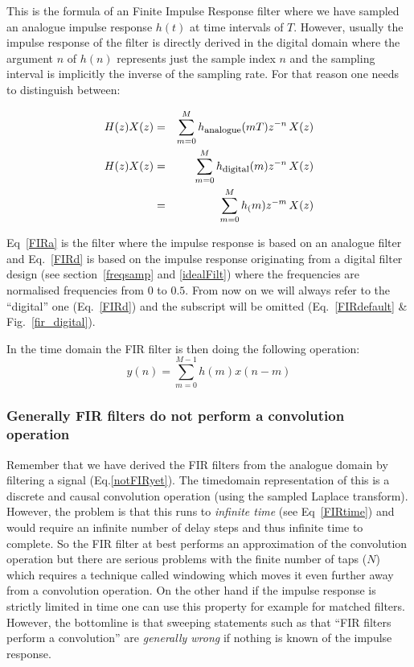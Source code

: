\documentclass[12pt,a4paper]{article}
\begin{document}
This is the formula of an Finite Impulse Response filter where we have
sampled an analogue impulse response $h(t)$ at time intervals of $T$.
However, usually the impulse response of the filter is directly derived
in the digital domain where the argument $n$ of $h(n)$ represents just the sample
index $n$ and the sampling interval is implicitly the inverse of the sampling
rate. For that reason one needs to distinguish between:

\begin{eqnarray}
H(z)X(z) & = & \sum_{m=0}^M h_\textrm{\footnotesize{analogue}}(mT) z^{-n} \, X(z) \label{FIRa} \\
H(z)X(z) & = & \sum_{m=0}^M h_\textrm{\footnotesize{digital}}(m) z^{-n} \, X(z) \label{FIRd} \\
         & = & \sum_{m=0}^M h_(m) z^{-m} \, X(z) \label{FIRdefault}
\end{eqnarray}

Eq~\ref{FIRa} is the filter where the impulse response is based on an analogue
filter and Eq.~\ref{FIRd} is based on the impulse response originating from a digital filter
design (see section~\ref{freqsamp} and \ref{idealFilt}) where the frequencies
are normalised frequencies from $0$ to $0.5$. From now on we will
always refer to the ``digital'' one (Eq.~\ref{FIRd}) and the subscript will be
omitted (Eq.~\ref{FIRdefault} \& Fig.~\ref{fir_digital}).

In the time domain the FIR filter is then doing the following operation:
\begin{equation}
  y(n) = \sum_{m=0}^{M-1} h(m) x(n-m) \label{FIRtime}
\end{equation}

\subsubsection{Generally FIR filters do not perform a convolution operation}

Remember that we have derived the FIR filters from the analogue domain
by filtering a signal (Eq.\ref{notFIRyet}). The timedomain
representation of this is a discrete and causal convolution operation
(using the sampled Laplace transform). However, the problem is that
this runs to \textsl{infinite time} (see Eq~\ref{FIRtime}) and would
require an infinite number of delay steps and thus infinite time to
complete. So the FIR filter at best performs an approximation of the
convolution operation but there are serious problems with the finite
number of taps ($N$) which requires a technique called windowing which
moves it even further away from a convolution operation. On the other
hand if the impulse response is strictly limited in time one can use
this property for example for matched filters. However, the bottomline
is that sweeping statements such as that ``FIR filters perform a
convolution'' are \textsl{generally wrong} if nothing is known of the
impulse response.
\end{document}
